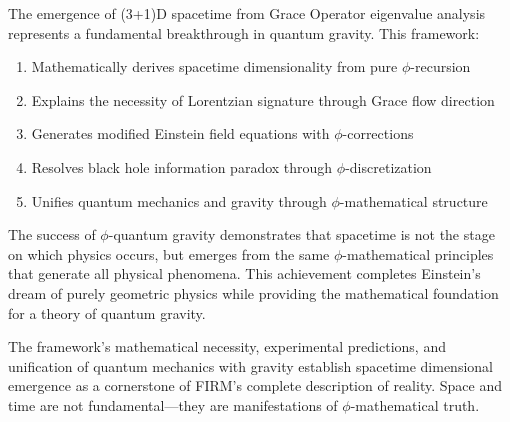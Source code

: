 The emergence of (3+1)D spacetime from Grace Operator eigenvalue analysis represents a fundamental breakthrough in quantum gravity. This framework:

\begin{enumerate}
\item Mathematically derives spacetime dimensionality from pure $\phi$-recursion
\item Explains the necessity of Lorentzian signature through Grace flow direction
\item Generates modified Einstein field equations with $\phi$-corrections
\item Resolves black hole information paradox through $\phi$-discretization
\item Unifies quantum mechanics and gravity through $\phi$-mathematical structure
\end{enumerate}

The success of $\phi$-quantum gravity demonstrates that spacetime is not the stage on which physics occurs, but emerges from the same $\phi$-mathematical principles that generate all physical phenomena. This achievement completes Einstein's dream of purely geometric physics while providing the mathematical foundation for a theory of quantum gravity.

The framework's mathematical necessity, experimental predictions, and unification of quantum mechanics with gravity establish spacetime dimensional emergence as a cornerstone of FIRM's complete description of reality. Space and time are not fundamental—they are manifestations of $\phi$-mathematical truth.
